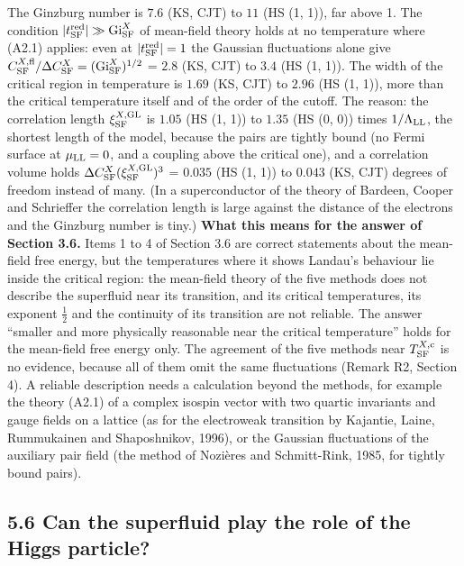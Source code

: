 \documentclass[
  10pt,
]{article}
\begin{document}
The Ginzburg number is \(7.6\) (KS, CJT) to \(11\) (HS (1, 1)), far
above 1. The condition
\(\lvert t^{\rm red}_{\rm SF}\rvert\gg{\rm Gi}^{X}_{\rm SF}\) of
mean-field theory holds at no temperature where (A2.1) applies: even at
\(\lvert t^{\rm red}_{\rm SF}\rvert=1\) the Gaussian fluctuations alone
give
\(C^{X,{\rm fl}}_{\rm SF}/\Delta C^X_{\rm SF}=({\rm Gi}^{X}_{\rm SF})^{1/2}\)
= \(2.8\) (KS, CJT) to \(3.4\) (HS (1, 1)). The width of the critical
region in temperature is \(1.69\) (KS, CJT) to \(2.96\) (HS (1, 1)),
more than the critical temperature itself and of the order of the
cutoff. The reason: the correlation length \(\xi^{X,{\rm GL}}_{\rm SF}\)
is \(1.05\) (HS (1, 1)) to \(1.35\) (HS (0, 0)) times
\(1/\Lambda_{\rm LL}\), the shortest length of the model, because the
pairs are tightly bound (no Fermi surface at \(\mu_{\rm LL}=0\), and a
coupling above the critical one), and a correlation volume holds
\(\Delta C^X_{\rm SF}(\xi^{X,{\rm GL}}_{\rm SF})^3\) = \(0.035\) (HS (1,
1)) to \(0.043\) (KS, CJT) degrees of freedom instead of many. (In a
superconductor of the theory of Bardeen, Cooper and Schrieffer the
correlation length is large against the distance of the electrons and
the Ginzburg number is tiny.) \textbf{What this means for the answer of
Section 3.6.} Items 1 to 4 of Section 3.6 are correct statements about
the mean-field free energy, but the temperatures where it shows Landau's
behaviour lie inside the critical region: the mean-field theory of the
five methods does not describe the superfluid near its transition, and
its critical temperatures, its exponent \(\tfrac12\) and the continuity
of its transition are not reliable. The answer ``smaller and more
physically reasonable near the critical temperature'' holds for the
mean-field free energy only. The agreement of the five methods near
\(T^{X,{\rm c}}_{\rm SF}\) is no evidence, because all of them omit the
same fluctuations (Remark R2, Section 4). A reliable description needs a
calculation beyond the methods, for example the theory (A2.1) of a
complex isospin vector with two quartic invariants and gauge fields on a
lattice (as for the electroweak transition by Kajantie, Laine,
Rummukainen and Shaposhnikov, 1996), or the Gaussian fluctuations of the
auxiliary pair field (the method of Nozières and Schmitt-Rink, 1985, for
tightly bound pairs).

\hypertarget{can-the-superfluid-play-the-role-of-the-higgs-particle}{%
\subsection{5.6 Can the superfluid play the role of the Higgs
particle?}\label{can-the-superfluid-play-the-role-of-the-higgs-particle}}
\end{document}
